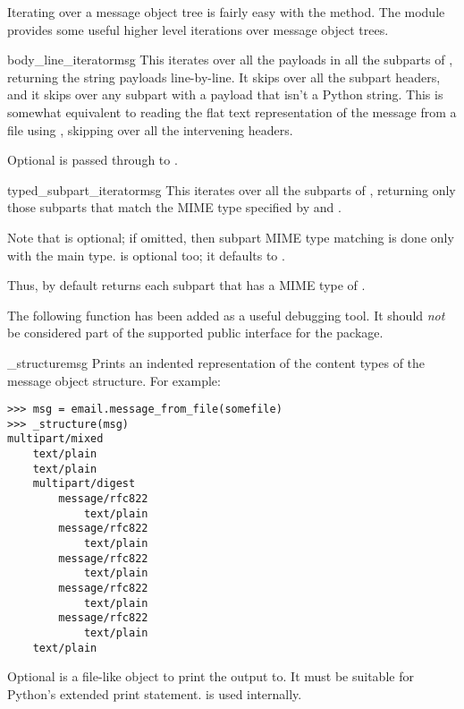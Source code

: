 
Iterating over a message object tree is fairly easy with the
 method.  The  module
provides some useful higher level iterations over message object
trees.

\begin{funcdesc}{body_line_iterator}{msg}
This iterates over all the payloads in all the subparts of ,
returning the string payloads line-by-line.  It skips over all the
subpart headers, and it skips over any subpart with a payload that
isn't a Python string.  This is somewhat equivalent to reading the
flat text representation of the message from a file using
, skipping over all the intervening headers.

Optional  is passed through to .
\end{funcdesc}

\begin{funcdesc}{typed_subpart_iterator}{msg}
This iterates over all the subparts of , returning only those
subparts that match the MIME type specified by  and
.

Note that  is optional; if omitted, then subpart MIME
type matching is done only with the main type.   is
optional too; it defaults to .

Thus, by default  returns each
subpart that has a MIME type of .
\end{funcdesc}

The following function has been added as a useful debugging tool.  It
should \emph{not} be considered part of the supported public interface
for the package.

\begin{funcdesc}{_structure}{msg}
Prints an indented representation of the content types of the
message object structure.  For example:

\begin{verbatim}
>>> msg = email.message_from_file(somefile)
>>> _structure(msg)
multipart/mixed
    text/plain
    text/plain
    multipart/digest
        message/rfc822
            text/plain
        message/rfc822
            text/plain
        message/rfc822
            text/plain
        message/rfc822
            text/plain
        message/rfc822
            text/plain
    text/plain
\end{verbatim}

Optional  is a file-like object to print the output to.  It
must be suitable for Python's extended print statement.  
is used internally.
\end{funcdesc}

